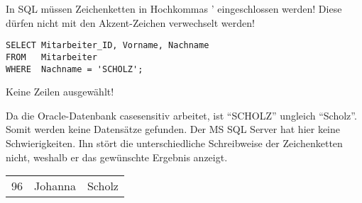 \begin{merke}
    In SQL müssen Zeichenketten in Hochkommas ' eingeschlossen werden! Diese dürfen nicht mit den Akzent-Zeichen verwechselt werden!
\end{merke}
\begin{lstlisting}[language=oracle_sql,caption={Ein einfacher Zeichenkettenvergleich},label=sql02_07]
SELECT Mitarbeiter_ID, Vorname, Nachname
FROM   Mitarbeiter
WHERE  Nachname = 'SCHOLZ';
          \end{lstlisting}
\begin{center}
    \begin{small}
        \begin{oraclesql}
            Keine Zeilen ausgewählt!
        \end{oraclesql}
    \end{small}
\end{center}
Da die Oracle-Datenbank casesensitiv arbeitet, ist \enquote{SCHOLZ} ungleich \enquote{Scholz}. Somit werden keine Datensätze gefunden. Der MS SQL Server hat hier keine Schwierigkeiten. Ihn stört die unterschiedliche Schreibweise der Zeichenketten nicht, weshalb er das gewünschte Ergebnis anzeigt.
\clearpage
\begin{center}
    \begin{small}
        \tablehead{}
        \begin{mssql}
            \begin{supertabular}{rll}
                96 & Johanna & Scholz \\
            \end{supertabular}
        \end{mssql}
    \end{small}
\end{center}
